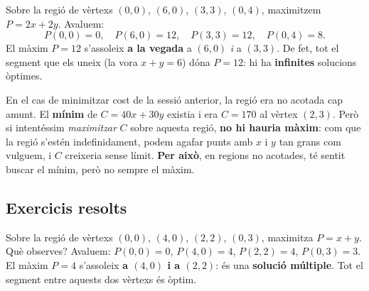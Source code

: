 \begin{exemple}
Sobre la regió de vèrtexs $(0,0)$, $(6,0)$, $(3,3)$, $(0,4)$, maximitzem
$P=2x+2y$. Avaluem:
\[
P(0,0)=0,\quad P(6,0)=12,\quad P(3,3)=12,\quad P(0,4)=8.
\]
El màxim $P=12$ s'assoleix \textbf{a la vegada} a $(6,0)$ \emph{i} a $(3,3)$. De fet,
tot el segment que els uneix (la vora $x+y=6$) dóna $P=12$: hi ha \textbf{infinites}
solucions òptimes.

\begin{center}

\end{center}
\end{exemple}

\begin{exemple}
En el cas de minimitzar cost de la sessió anterior, la regió era no acotada cap amunt.
El \textbf{mínim} de $C=40x+30y$ existia i era $C=170$ al vèrtex $(2,3)$. Però si
intentéssim \emph{maximitzar} $C$ sobre aquesta regió, \textbf{no hi hauria màxim}:
com que la regió s'estén indefinidament, podem agafar punts amb $x$ i $y$ tan grans
com vulguem, i $C$ creixeria sense límit. \textbf{Per això}, en regions no acotades,
té sentit buscar el mínim, però no sempre el màxim.
\end{exemple}

\subsection{Exercicis resolts}

\begin{exresolt}
Sobre la regió de vèrtexs $(0,0)$, $(4,0)$, $(2,2)$, $(0,3)$, maximitza $P=x+y$. Què
observes?
\solucio
Avaluem: $P(0,0)=0$, $P(4,0)=4$, $P(2,2)=4$, $P(0,3)=3$. El màxim $P=4$ s'assoleix
\textbf{a $(4,0)$ i a $(2,2)$}: és una \textbf{solució múltiple}. Tot el segment entre
aquests dos vèrtexs és òptim.
\end{exresolt}

